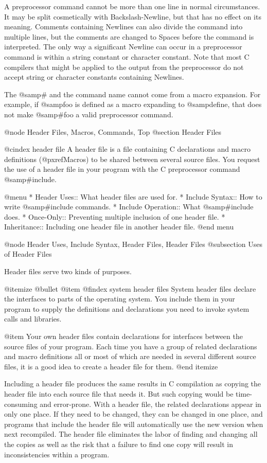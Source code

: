 {A preprocessor command cannot be more than one line in normal circumstances.
It may be split cosmetically with Backslash-Newline, but that has no effect
on its meaning.  Comments containing Newlines can also divide the command into
multiple lines, but the comments are changed to Spaces before the command
is interpreted.  The only way a significant Newline can occur in a preprocessor
command is within a string constant or character constant.  Note that
most C compilers that might be applied to the output from the preprocessor
do not accept string or character constants containing Newlines.

The @samp{#} and the command name cannot come from a macro expansion.  For
example, if @samp{foo} is defined as a macro expanding to @samp{define},
that does not make @samp{#foo} a valid preprocessor command.

@node Header Files, Macros, Commands, Top
@section Header Files

@cindex header file
A header file is a file containing C declarations and macro definitions
(@pxref{Macros}) to be shared between several source files.  You request
the use of a header file in your program with the C preprocessor command
@samp{#include}.

@menu
* Header Uses::         What header files are used for.
* Include Syntax::      How to write @samp{#include} commands.
* Include Operation::   What @samp{#include} does.
* Once-Only::		Preventing multiple inclusion of one header file.
* Inheritance::         Including one header file in another header file.
@end menu

@node Header Uses, Include Syntax, Header Files, Header Files
@subsection Uses of Header Files

Header files serve two kinds of purposes.

@itemize @bullet
@item
@findex system header files
System header files declare the interfaces to parts of the operating
system.  You include them in your program to supply the definitions and
declarations you need to invoke system calls and libraries.

@item
Your own header files contain declarations for interfaces between the
source files of your program.  Each time you have a group of related
declarations and macro definitions all or most of which are needed in
several different source files, it is a good idea to create a header
file for them.
@end itemize

Including a header file produces the same results in C compilation as
copying the header file into each source file that needs it.  But such
copying would be time-consuming and error-prone.  With a header file, the
related declarations appear in only one place.  If they need to be changed,
they can be changed in one place, and programs that include the header file
will automatically use the new version when next recompiled.  The header
file eliminates the labor of finding and changing all the copies as well as
the risk that a failure to find one copy will result in inconsistencies
within a program.

}
